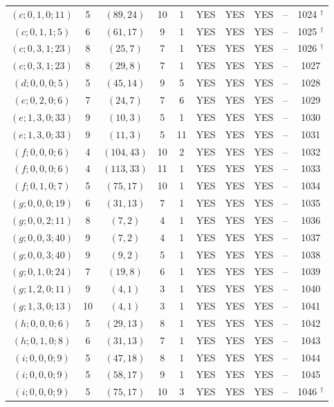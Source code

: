 \begin{longtable}{|c|c|c|c|c|c|c|c|c|c|}
$(c; 0, 1, 0; 11)$ & 5 & $(89, 24)$ & 10 & 1 & YES & YES & YES & -- & 1024 ${}^\dagger$\\
$(c; 0, 1, 1; 5)$ & 6 & $(61, 17)$ & 9 & 1 & YES & YES & YES & -- & 1025 ${}^\dagger$\\
$(c; 0, 3, 1; 23)$ & 8 & $(25, 7)$ & 7 & 1 & YES & YES & YES & -- & 1026 ${}^\dagger$\\
$(c; 0, 3, 1; 23)$ & 8 & $(29, 8)$ & 7 & 1 & YES & YES & YES & -- & 1027\\
$(d; 0, 0, 0; 5)$ & 5 & $(45, 14)$ & 9 & 5 & YES & YES & YES & -- & 1028\\
$(e; 0, 2, 0; 6)$ & 7 & $(24, 7)$ & 7 & 6 & YES & YES & YES & -- & 1029\\
$(e; 1, 3, 0; 33)$ & 9 & $(10, 3)$ & 5 & 1 & YES & YES & YES & -- & 1030\\
$(e; 1, 3, 0; 33)$ & 9 & $(11, 3)$ & 5 & 11 & YES & YES & YES & -- & 1031\\
$(f; 0, 0, 0; 6)$ & 4 & $(104, 43)$ & 10 & 2 & YES & YES & YES & -- & 1032\\
$(f; 0, 0, 0; 6)$ & 4 & $(113, 33)$ & 11 & 1 & YES & YES & YES & -- & 1033\\
$(f; 0, 1, 0; 7)$ & 5 & $(75, 17)$ & 10 & 1 & YES & YES & YES & -- & 1034\\
$(g; 0, 0, 0; 19)$ & 6 & $(31, 13)$ & 7 & 1 & YES & YES & YES & -- & 1035\\
$(g; 0, 0, 2; 11)$ & 8 & $(7, 2)$ & 4 & 1 & YES & YES & YES & -- & 1036\\
$(g; 0, 0, 3; 40)$ & 9 & $(7, 2)$ & 4 & 1 & YES & YES & YES & -- & 1037\\
$(g; 0, 0, 3; 40)$ & 9 & $(9, 2)$ & 5 & 1 & YES & YES & YES & -- & 1038\\
$(g; 0, 1, 0; 24)$ & 7 & $(19, 8)$ & 6 & 1 & YES & YES & YES & -- & 1039\\
$(g; 1, 2, 0; 11)$ & 9 & $(4, 1)$ & 3 & 1 & YES & YES & YES & -- & 1040\\
$(g; 1, 3, 0; 13)$ & 10 & $(4, 1)$ & 3 & 1 & YES & YES & YES & -- & 1041\\
$(h; 0, 0, 0; 6)$ & 5 & $(29, 13)$ & 8 & 1 & YES & YES & YES & -- & 1042\\
$(h; 0, 1, 0; 8)$ & 6 & $(31, 13)$ & 7 & 1 & YES & YES & YES & -- & 1043\\
$(i; 0, 0, 0; 9)$ & 5 & $(47, 18)$ & 8 & 1 & YES & YES & YES & -- & 1044\\
$(i; 0, 0, 0; 9)$ & 5 & $(58, 17)$ & 9 & 1 & YES & YES & YES & -- & 1045\\
$(i; 0, 0, 0; 9)$ & 5 & $(75, 17)$ & 10 & 3 & YES & YES & YES & -- & 1046 ${}^\dagger$\\

\end{longtable}
